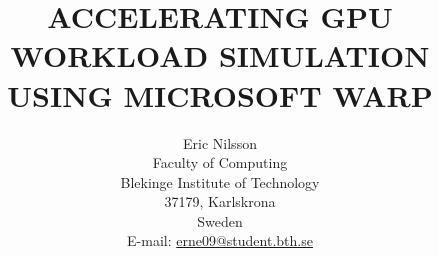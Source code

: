 \documentclass[a4paper,twocolumn,10pt]{article}
\begin{document}
\title{ACCELERATING GPU WORKLOAD SIMULATION USING MICROSOFT WARP} %
\author{Eric Nilsson\\
Faculty of Computing\\
Blekinge Institute of Technology\\
37179, Karlskrona\\
Sweden\\
E-mail: \href{mailto:erne09@student.bth.se}{erne09@student.bth.se}}
\date{}

\maketitle

\thispagestyle{empty}





\newpage

\newpage


\newpage

\end{document}

